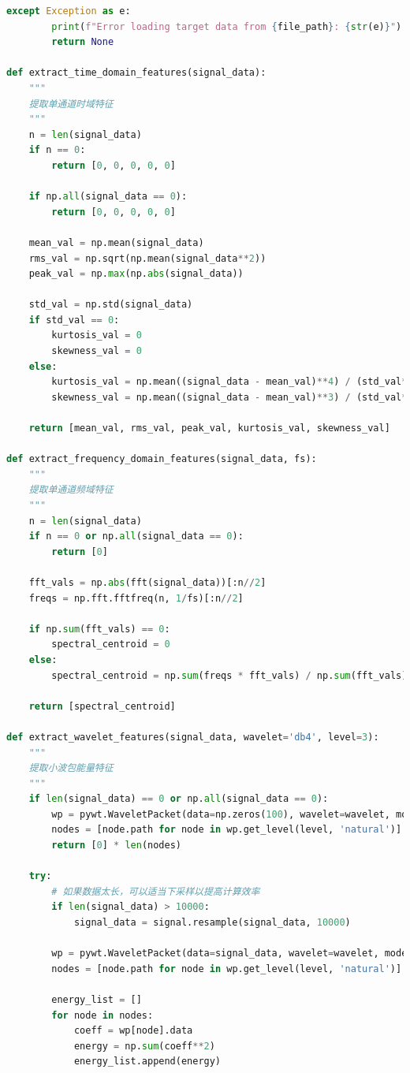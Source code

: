 \documentclass[a4paper]{CPIPC}
\numberwithin{equation}{section}
\begin{document}
\begin{lstlisting}[language=Python, caption=Target Domain Feature Extraction]
    except Exception as e:
        print(f"Error loading target data from {file_path}: {str(e)}")
        return None

def extract_time_domain_features(signal_data):
    """
    提取单通道时域特征
    """
    n = len(signal_data)
    if n == 0:
        return [0, 0, 0, 0, 0]
    
    if np.all(signal_data == 0):
        return [0, 0, 0, 0, 0]
    
    mean_val = np.mean(signal_data)
    rms_val = np.sqrt(np.mean(signal_data**2))
    peak_val = np.max(np.abs(signal_data))

    std_val = np.std(signal_data)
    if std_val == 0:
        kurtosis_val = 0
        skewness_val = 0
    else:
        kurtosis_val = np.mean((signal_data - mean_val)**4) / (std_val**4)
        skewness_val = np.mean((signal_data - mean_val)**3) / (std_val**3)
    
    return [mean_val, rms_val, peak_val, kurtosis_val, skewness_val]

def extract_frequency_domain_features(signal_data, fs):
    """
    提取单通道频域特征
    """
    n = len(signal_data)
    if n == 0 or np.all(signal_data == 0):
        return [0]
    
    fft_vals = np.abs(fft(signal_data))[:n//2]
    freqs = np.fft.fftfreq(n, 1/fs)[:n//2]
    
    if np.sum(fft_vals) == 0:
        spectral_centroid = 0
    else:
        spectral_centroid = np.sum(freqs * fft_vals) / np.sum(fft_vals)
    
    return [spectral_centroid]

def extract_wavelet_features(signal_data, wavelet='db4', level=3):
    """
    提取小波包能量特征
    """
    if len(signal_data) == 0 or np.all(signal_data == 0):
        wp = pywt.WaveletPacket(data=np.zeros(100), wavelet=wavelet, mode='symmetric', maxlevel=level)
        nodes = [node.path for node in wp.get_level(level, 'natural')]
        return [0] * len(nodes)
    
    try:
        # 如果数据太长，可以适当下采样以提高计算效率
        if len(signal_data) > 10000:
            signal_data = signal.resample(signal_data, 10000)
        
        wp = pywt.WaveletPacket(data=signal_data, wavelet=wavelet, mode='symmetric', maxlevel=level)
        nodes = [node.path for node in wp.get_level(level, 'natural')]
        
        energy_list = []
        for node in nodes:
            coeff = wp[node].data
            energy = np.sum(coeff**2)
            energy_list.append(energy)
        

\end{lstlisting}
\end{document}
